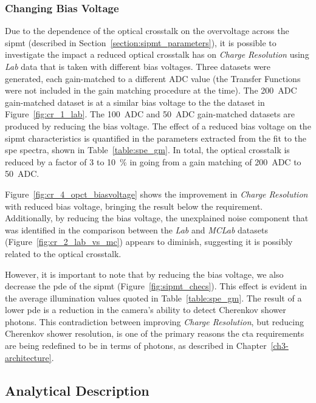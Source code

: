 \subsubsection{Changing Bias Voltage}

Due to the dependence of the optical crosstalk on the overvoltage across the \gls{sipmt} (described in Section~\ref{section:sipmt_parameters}), it is possible to investigate the impact a reduced optical crosstalk has on \textit{Charge Resolution} using \textit{Lab} data that is taken with different bias voltages. Three datasets were generated, each gain-matched to a different ADC value (the Transfer Functions were not included in the gain matching procedure at the time). The \SI{200}{ADC} gain-matched dataset is at a similar bias voltage to the the dataset in Figure~\ref{fig:cr_1_lab}. The \SI{100}{ADC} and \SI{50}{ADC} gain-matched datasets are produced by reducing the bias voltage. The effect of a reduced bias voltage on the \gls{sipmt} characteristics is quantified in the parameters extracted from the fit to the \gls{spe} spectra, shown in Table~\ref{table:spe_gm}. In total, the optical crosstalk is reduced by a factor of 3 to \SI{10}{\percent} in going from a gain matching of \SI{200}{ADC} to \SI{50}{ADC}.

Figure~\ref{fig:cr_4_opct_biasvoltage} shows the improvement in \textit{Charge Resolution} with reduced bias voltage, bringing the result below the requirement. Additionally, by reducing the bias voltage, the unexplained noise component that was identified in the comparison between the \textit{Lab} and \textit{MCLab} datasets (Figure~\ref{fig:cr_2_lab_vs_mc}) appears to diminish, suggesting it is possibly related to the optical crosstalk.

However, it is important to note that by reducing the bias voltage, we also decrease the \gls{pde} of the \gls{sipmt} (Figure~\ref{fig:sipmt_checs}). This effect is evident in the average illumination values quoted in Table~\ref{table:spe_gm}. The result of a lower \gls{pde} is a reduction in the camera's ability to detect Cherenkov shower photons. This contradiction between improving \textit{Charge Resolution}, but reducing Cherenkov shower resolution, is one of the primary reasons the \gls{cta} requirements are being redefined to be in terms of photons, as described in Chapter~\ref{ch3-architecture}.

\subsection{Analytical Description}


